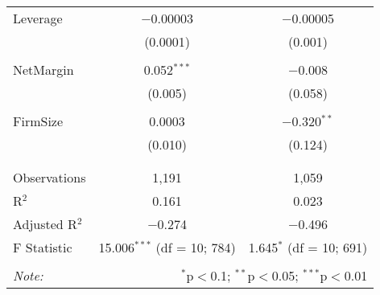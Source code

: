 \documentclass[]{article}
\begin{document}
\begin{table}[h]
\begin{tabular}{@{\extracolsep{5pt}}lcc}
 Leverage & $-$0.00003 & $-$0.00005 \\ 
  & (0.0001) & (0.001) \\ 
  & & \\ 
 NetMargin & 0.052$^{***}$ & $-$0.008 \\ 
  & (0.005) & (0.058) \\ 
  & & \\ 
 FirmSize & 0.0003 & $-$0.320$^{**}$ \\ 
  & (0.010) & (0.124) \\ 
  & & \\ 
\hline \\[-1.8ex] 
Observations & 1,191 & 1,059 \\ 
R$^{2}$ & 0.161 & 0.023 \\ 
Adjusted R$^{2}$ & $-$0.274 & $-$0.496 \\ 
F Statistic & 15.006$^{***}$ (df = 10; 784) & 1.645$^{*}$ (df = 10; 691) \\ 
\hline 
\hline \\[-1.8ex] 
\textit{Note:}  & \multicolumn{2}{r}{$^{*}$p$<$0.1; $^{**}$p$<$0.05; $^{***}$p$<$0.01} \\ 
\end{tabular} 
\end{table}
\end{document}
